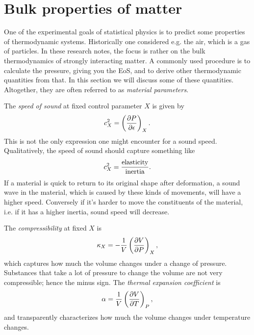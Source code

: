 \section{Bulk properties of matter}

One of the experimental goals of statistical physics is to predict some
properties of thermodynamic systems. Historically one considered e.g.
the air, which is a gas of particles. In these research notes, the focus
is rather on the bulk thermodynamics of strongly interacting matter.
A commonly used procedure is to calculate the pressure, giving
you the EoS, and to derive other thermodynamic quantities from that.
In this section we will discuss some of these quantities.
Altogether, they are often referred to as {\it material
parameters}.

The {\it speed of sound} at fixed control parameter $X$
is given by
\begin{equation}
  c_X^2=\left(\pdv{P}{\epsilon}\right)_{X}.
\end{equation}
This is not the only expression one might encounter for a sound speed.
Qualitatively, the speed of sound should capture something like
\begin{equation}
  c_X^2=\frac{{\rm elasticity}}{{\rm inertia}}.
\end{equation}
If a material is quick to return to its original shape after deformation, a sound
wave in the material, which is caused by these kinds of movements, will have a
higher speed. Conversely if it's harder to move the constituents of the
material, i.e. if it has a higher inertia, sound speed will decrease.


The {\it compressibility} at fixed $X$ is
\begin{equation}
  \kappa_X=-\frac{1}{V}\left(\pdv{V}{P}\right)_{X},
\end{equation}
which captures how much the volume changes under a change of pressure.
Substances that take a lot of pressure to change the volume are not
very compressible; hence the minus sign.
The {\it thermal expansion coefficient}
is
\begin{equation}
  \alpha=\frac{1}{V}\left(\pdv{V}{T}\right)_{P},
\end{equation}
and transparently characterizes how much the volume changes under temperature
changes.

